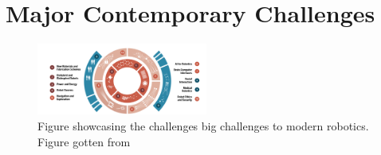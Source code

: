 \documentclass[conference]{IEEEtran}
\begin{document}
\section{Major Contemporary Challenges}
\begin{figure}
    \centerline{\includegraphics[width=0.5\textwidth]{images/grand_challenges.png}}
    \caption{Figure showcasing the challenges big challenges to modern robotics. Figure gotten from\autocite{yang2018grand}}
\label{fig3}
\end{figure}
\end{document}
